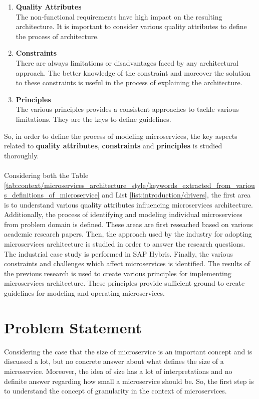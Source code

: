 \begin{enumerate}
\item \textbf{Quality Attributes}\\
The non-functional requirements have high impact on the resulting architecture. It is important to consider various quality attributes to define the process of architecture.
\item \textbf{Constraints}\\
There are always limitations or disadvantages faced by any architectural approach.  The better knowledge of the constraint and moreover the solution to these constraints is useful in the process of explaining the architecture.
\item \textbf{Principles}\\
The various principles provides a consistent approaches to tackle various limitations. They are the keys to define guidelines.
\end{enumerate}
So, in order to define the process of modeling microservices, the key aspects related to \textbf{quality attributes}, \textbf{constraints} and \textbf{principles} is studied thoroughly.
\\
\\
Considering both the Table \ref{tab:context/microservices_architecture_style/keywords_extracted_from_various_definitions_of_microservice} and List \ref{list:introduction/drivers}, the first area is to understand various quality attributes influencing microservices architecture. Additionally, the process of identifying and modeling individual microservices from problem domain is defined. These areas are first reseached based on various academic research papers. Then, the approach used by the industry for adopting microservices architecture is studied in order to answer the research questions. The industrial case study is performed in SAP Hybris.
Finally, the various constraints and challenges which affect microservices is identified. 
The results of the previous research is used to create various principles for implementing microservices architecture. These principles provide sufficient ground to create guidelines for modeling and operating microservices.

\section{Problem Statement}\label{section:context/problem_statement}
Considering the case that the size of microservice is an important concept and is discussed a lot, but no concrete answer about what defines the size of a microservice. Moreover, the idea of size has a lot of interpretations and no definite answer regarding how small a microservice should be. So, the first step is to understand the concept of granularity in the context of microservices.